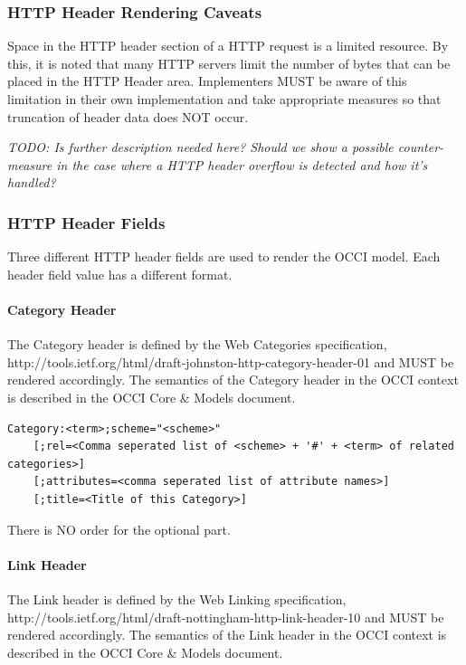\documentclass[10pt,a4paper]{article}
\begin{document}
\subsubsection{HTTP Header Rendering Caveats}

Space in the HTTP header section of a HTTP request is a limited resource. By this, it is noted that many HTTP servers limit the number of bytes that can be placed in the HTTP Header area. Implementers MUST be aware of this limitation in their own implementation and take appropriate measures so that truncation of header data does NOT occur. 

\emph{TODO: Is further description needed here? Should we show a possible counter-measure in the case where a HTTP header overflow is detected and how it's handled?}

\subsubsection{HTTP Header Fields}

Three different HTTP header fields are used to render the OCCI model. Each header field value has a different format.

\paragraph{Category Header}

The Category header is defined by the Web Categories specification, http://tools.ietf.org/html/draft-johnston-http-category-header-01 and MUST be rendered accordingly. The semantics of the Category header in the OCCI context is described in the OCCI Core \& Models document.

\begin{verbatim}
Category:<term>;scheme="<scheme>"
    [;rel=<Comma seperated list of <scheme> + '#' + <term> of related categories>]
    [;attributes=<comma seperated list of attribute names>]
    [;title=<Title of this Category>]    
\end{verbatim}

There is NO order for the optional part.

\paragraph{Link Header}

The Link header is defined by the Web Linking specification, http://tools.ietf.org/html/draft-nottingham-http-link-header-10 and MUST be rendered accordingly. The semantics of the Link header in the OCCI context is described in the OCCI Core \& Models document.
\end{document}
